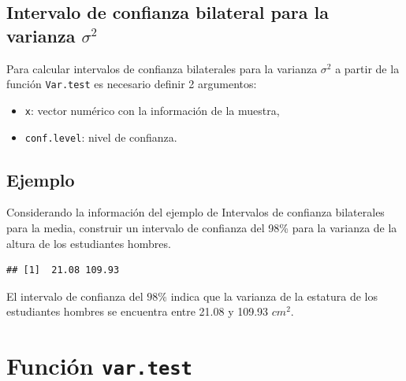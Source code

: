 \documentclass[10pt,]{krantz}
\makeatletter
\newenvironment{Shaded}{\begin{snugshade}}{\end{snugshade}}
\newcommand{\KeywordTok}[1]{\textcolor[rgb]{0.13,0.29,0.53}{\textbf{#1}}}
\newcommand{\DataTypeTok}[1]{\textcolor[rgb]{0.13,0.29,0.53}{#1}}
\newcommand{\FloatTok}[1]{\textcolor[rgb]{0.00,0.00,0.81}{#1}}
\newcommand{\StringTok}[1]{\textcolor[rgb]{0.31,0.60,0.02}{#1}}
\newcommand{\CommentTok}[1]{\textcolor[rgb]{0.56,0.35,0.01}{\textit{#1}}}
\newcommand{\OperatorTok}[1]{\textcolor[rgb]{0.81,0.36,0.00}{\textbf{#1}}}
\newcommand{\NormalTok}[1]{#1}
\providecommand{\tightlist}{%
  \setlength{\itemsep}{0pt}\setlength{\parskip}{0pt}}
\newenvironment{kframe}{%
\medskip{}
\setlength{\fboxsep}{.8em}
 \def\at@end@of@kframe{}%
 \ifinner\ifhmode%
  \def\at@end@of@kframe{\end{minipage}}%
  \begin{minipage}{\columnwidth}%
 \fi\fi%
 \def\FrameCommand##1{\hskip\@totalleftmargin \hskip-\fboxsep
 \colorbox{shadecolor}{##1}\hskip-\fboxsep
     \hskip-\linewidth \hskip-\@totalleftmargin \hskip\columnwidth}%
 \MakeFramed {\advance\hsize-\width
   \@totalleftmargin\z@ \linewidth\hsize
   \@setminipage}}%
 {\par\unskip\endMakeFramed%
 \at@end@of@kframe}
\renewenvironment{Shaded}{\begin{kframe}}{\end{kframe}}
\makeatother
\begin{document}
\subsection{\texorpdfstring{Intervalo de confianza bilateral para la
varianza
\(\sigma^2\)}{Intervalo de confianza bilateral para la varianza \textbackslash{}sigma\^{}2}}\label{intervalo-de-confianza-bilateral-para-la-varianza-sigma2}

Para calcular intervalos de confianza bilaterales para la varianza
\(\sigma^2\) a partir de la función \texttt{Var.test} es necesario
definir 2 argumentos:

\begin{itemize}
\tightlist
\item
  \texttt{x}: vector numérico con la información de la muestra,
\item
  \texttt{conf.level}: nivel de confianza.
\end{itemize}

\subsection*{Ejemplo}\label{ejemplo-58}


Considerando la información del ejemplo de Intervalos de confianza
bilaterales para la media, construir un intervalo de confianza del 98\%
para la varianza de la altura de los estudiantes hombres.

\begin{Shaded}
\end{Shaded}

\begin{verbatim}
## [1]  21.08 109.93
\end{verbatim}

El intervalo de confianza del \(98\%\) indica que la varianza de la
estatura de los estudiantes hombres se encuentra entre 21.08 y 109.93
\(cm^{2}\).

\section{\texorpdfstring{Función
\texttt{var.test}}{Función var.test}}\label{funcion-var.test-1}
\end{document}
